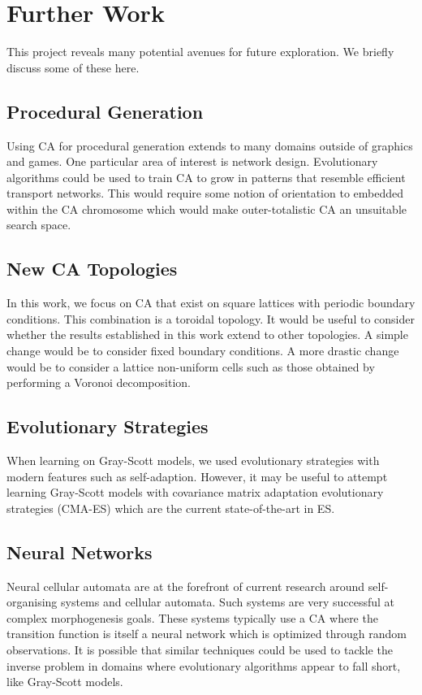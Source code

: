\section{Further Work}

This project reveals many potential avenues for future exploration. We briefly discuss some of these here.

\subsection{Procedural Generation}

Using CA for procedural generation extends to many domains outside of graphics and games. One particular area of interest is network design. Evolutionary algorithms could be used to train CA to grow in patterns that resemble efficient transport networks. This would require some notion of orientation to embedded within the CA chromosome which would make outer-totalistic CA an unsuitable search space.

\subsection{New CA Topologies}

In this work, we focus on CA that exist on square lattices with periodic boundary conditions. This combination is a toroidal topology. It would be useful to consider whether the results established in this work extend to other topologies. A simple change would be to consider fixed boundary conditions. A more drastic change would be to consider a lattice non-uniform cells such as those obtained by performing a Voronoi decomposition.

\subsection{Evolutionary Strategies}

When learning on Gray-Scott models, we used evolutionary strategies with modern features such as self-adaption. However, it may be useful to attempt learning Gray-Scott models with covariance matrix adaptation evolutionary strategies (CMA-ES) which are the current state-of-the-art in ES.

\subsection{Neural Networks}

Neural cellular automata are at the forefront of current research around self-organising systems and cellular automata. Such systems are very successful at complex morphogenesis goals. These systems typically use a CA where the transition function is itself a neural network which is optimized through random observations. It is possible that similar techniques could be used to tackle the inverse problem in domains where evolutionary algorithms appear to fall short, like Gray-Scott models.
